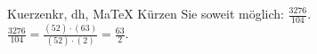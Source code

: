 \begin{MAufgabe}{Kuerzen}{kr, dh, MaTeX}
K\"urzen Sie soweit m\"oglich: $\frac{3276}{104}$.\\ 
\ifLsg\MLoesung
\quad $\frac{3276}{104}=\frac{(52)\cdot(63)}{(52)\cdot(2)}=\frac{63}{2}$.\else\relax\fi
 \end{MAufgabe}